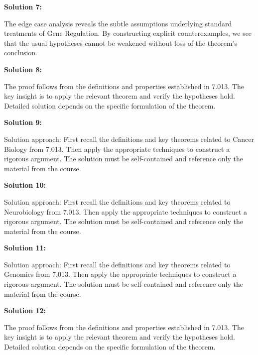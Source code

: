 \documentclass[12pt,a4paper]{exam}
\begin{document}
\vspace{0.5cm}

\textbf{Solution 7:}

The edge case analysis reveals the subtle assumptions underlying standard treatments of Gene Regulation. By constructing explicit counterexamples, we see that the usual hypotheses cannot be weakened without loss of the theorem's conclusion.

\vspace{0.5cm}

\textbf{Solution 8:}

The proof follows from the definitions and properties established in 7.013. The key insight is to apply the relevant theorem and verify the hypotheses hold. Detailed solution depends on the specific formulation of the theorem.

\vspace{0.5cm}

\textbf{Solution 9:}

Solution approach: First recall the definitions and key theorems related to Cancer Biology from 7.013. Then apply the appropriate techniques to construct a rigorous argument. The solution must be self-contained and reference only the material from the course.

\vspace{0.5cm}

\textbf{Solution 10:}

Solution approach: First recall the definitions and key theorems related to Neurobiology from 7.013. Then apply the appropriate techniques to construct a rigorous argument. The solution must be self-contained and reference only the material from the course.

\vspace{0.5cm}

\textbf{Solution 11:}

Solution approach: First recall the definitions and key theorems related to Genomics from 7.013. Then apply the appropriate techniques to construct a rigorous argument. The solution must be self-contained and reference only the material from the course.

\vspace{0.5cm}

\textbf{Solution 12:}

The proof follows from the definitions and properties established in 7.013. The key insight is to apply the relevant theorem and verify the hypotheses hold. Detailed solution depends on the specific formulation of the theorem.
\end{document}
